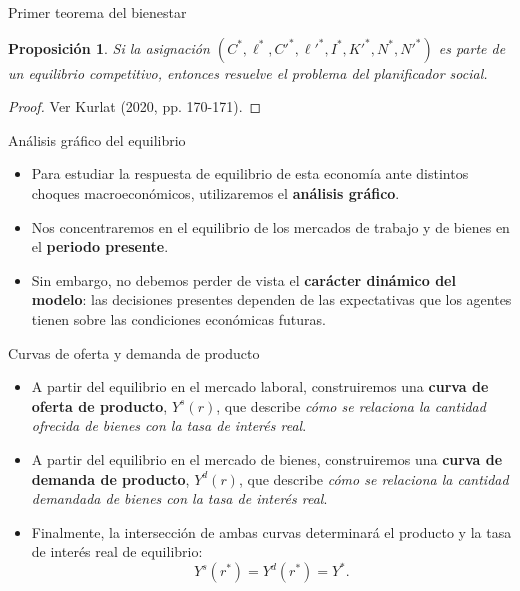 \documentclass[aspectratio=169,11pt]{beamer}
\newtheorem{proposition}[theorem]{Proposición}
\begin{document}
\begin{frame}{Primer teorema del bienestar}
  \begin{proposition}
    Si la asignación $(C^*, \ell^*, C'^{*}, \ell'^{*}, I^*, K'^{*}, N^*, N'^{*})$ es parte de un equilibrio competitivo, entonces resuelve el problema del planificador social.
  \end{proposition}
  \begin{proof}
    Ver Kurlat (2020, pp. 170-171).
  \end{proof}
\end{frame}




\begin{frame}{Análisis gráfico del equilibrio}
  \begin{itemize}
    \item Para estudiar la respuesta de equilibrio de esta economía ante distintos choques macroeconómicos, utilizaremos el \textbf{análisis gráfico}.
    
    \item Nos concentraremos en el equilibrio de los mercados de trabajo y de bienes en el \textbf{periodo presente}.
    
    \item Sin embargo, no debemos perder de vista el \textbf{carácter dinámico del modelo}: las decisiones presentes dependen de las expectativas que los agentes tienen sobre las condiciones económicas futuras.
  \end{itemize}
\end{frame}


\begin{frame}{Curvas de oferta y demanda de producto}
  \begin{itemize}
    \setlength{\itemsep}{0.65em}
    \item A partir del equilibrio en el mercado laboral, construiremos una \textbf{curva de oferta de producto}, \(Y^s(r)\), que describe \textit{cómo se relaciona la cantidad ofrecida de bienes con la tasa de interés real}.

    \item A partir del equilibrio en el mercado de bienes, construiremos una \textbf{curva de demanda de producto}, \(Y^d(r)\), que describe \textit{cómo se relaciona la cantidad demandada de bienes con la tasa de interés real}.

    \item Finalmente, la intersección de ambas curvas determinará el producto y la tasa de interés real de equilibrio:
    \[
      \boxed{Y^s(r^*)=Y^d(r^*)=Y^*}.
    \]
  \end{itemize}
\end{frame}
\end{document}
